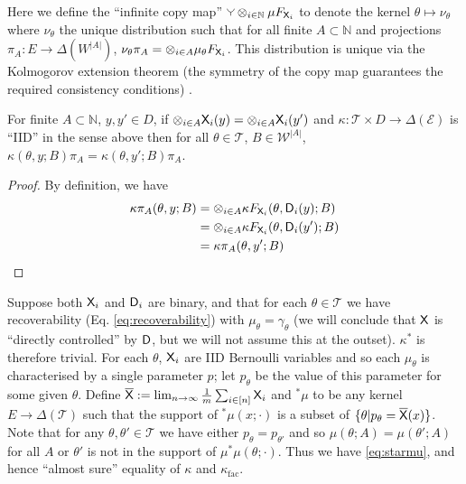 Here we define the ``infinite copy map'' $\splitter{0.1}\otimes_{i\in\mathbb{N}}\mu F_{\RV{X}_i}$ to denote the kernel $\theta\mapsto \nu_\theta$ where $\nu_\theta$ the unique distribution such that for all finite $A\subset \mathbb{N}$ and projections $\pi_{A}:E\to \Delta(W^{|A|})$, $\nu_\theta \pi_{A}=\otimes_{i\in A}\mu_\theta F_{\mathsf{X}_i}$. This distribution is unique via the Kolmogorov extension theorem (the symmetry of the copy map guarantees the required consistency conditions) \citep{tao_introduction_2011}.


\begin{lemma}\label{lem:agree_on_truncations}
For finite $A\subset\mathbb{N}$, $y,y'\in D$, if $\otimes_{i\in A} \mathsf{X}_i(y) = \otimes_{i\in A} \mathsf{X}_i(y')$ and $\kappa:\mathscr{T}\times D\to \Delta(\mathcal{E})$ is ``IID'' in the sense above then for all $\theta\in \mathscr{T}$, $B\in\mathcal{W}^{|A|}$, $\kappa(\theta,y;B) \pi_A = \kappa(\theta,y';B) \pi_A$.
\end{lemma}

\begin{proof}
By definition, we have 
\begin{align}
	\kappa \pi_A (\theta,y;B) &= \otimes_{i\in A} \kappa F_{\mathsf{X}_i} (\theta,\mathsf{D}_i(y);B)\\
							 &= \otimes_{i\in A} \kappa F_{\mathsf{X}_i} (\theta,\mathsf{D}_i(y');B)\\
							 &= \kappa \pi_A (\theta,y';B)
\end{align}
\end{proof}

Suppose both $\mathsf{X}_i$ and $\mathsf{D}_i$ are binary, and that for each $\theta\in \mathscr{T}$ we have recoverability (Eq. \ref{eq:recoverability}) with $\mu_\theta=\gamma_\theta$ (we will conclude that $\mathsf{X}$ is ``directly controlled'' by $\mathsf{D}$, but we will not assume this at the outset). $\kappa^*$ is therefore trivial. For each $\theta$, $\mathsf{X}_i$ are IID Bernoulli variables and so each $\mu_\theta$ is characterised by a single parameter $p$; let $p_\theta$ be the value of this parameter for some given $\theta$. Define $\overline{\mathsf{X}} := \lim_{n\to\infty} \frac{1}{m}\sum_{i\in[n]} \mathsf{X}_i$ and $^*\mu$ to be any kernel $E\to \Delta(\mathscr{T})$ such that the support of $^*\mu(x;\cdot)$ is a subset of $\{\theta|p_\theta=\overline{\mathsf{X}}(x)\}$. Note that for any $\theta,\theta'\in \mathscr{T}$ we have either $p_\theta=p_{\theta'}$ and so $\mu(\theta;A)=\mu(\theta';A)$ for all $A$ or $\theta'$ is not in the support of $\mu^*\mu(\theta;\cdot)$. Thus we have \ref{eq:starmu}, and hence ``almost sure'' equality of $\kappa$ and $\kappa_{\mathrm{fac}}$.


